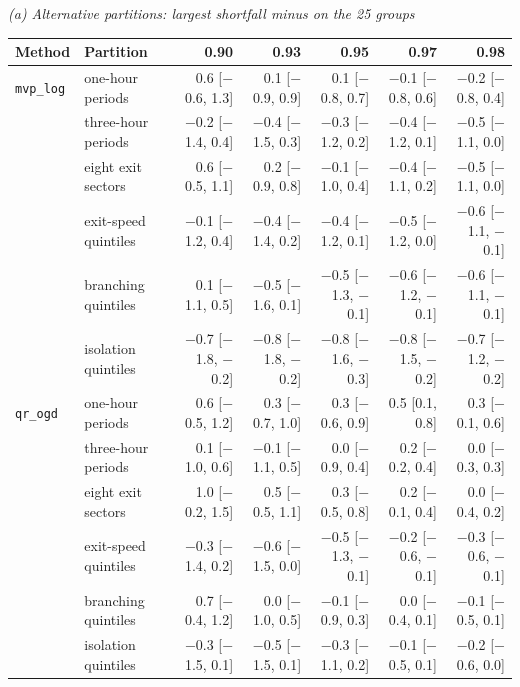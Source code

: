 \setlength{\tabcolsep}{3.0pt}
\emph{(a) Alternative partitions: largest shortfall minus \Dbar{} on the 25 groups}\par\smallskip
\begin{tabular}{@{}llrrrrr@{}}
\toprule
Method & Partition & 0.90 & 0.93 & 0.95 & 0.97 & 0.98 \\
\midrule
\texttt{mvp\_log} & one-hour periods & 0.6 [$-$0.6, 1.3] & 0.1 [$-$0.9, 0.9] & 0.1 [$-$0.8, 0.7] & $-$0.1 [$-$0.8, 0.6] & $-$0.2 [$-$0.8, 0.4] \\
 & three-hour periods & $-$0.2 [$-$1.4, 0.4] & $-$0.4 [$-$1.5, 0.3] & $-$0.3 [$-$1.2, 0.2] & $-$0.4 [$-$1.2, 0.1] & $-$0.5 [$-$1.1, 0.0] \\
 & eight exit sectors & 0.6 [$-$0.5, 1.1] & 0.2 [$-$0.9, 0.8] & $-$0.1 [$-$1.0, 0.4] & $-$0.4 [$-$1.1, 0.2] & $-$0.5 [$-$1.1, 0.0] \\
 & exit-speed quintiles & $-$0.1 [$-$1.2, 0.4] & $-$0.4 [$-$1.4, 0.2] & $-$0.4 [$-$1.2, 0.1] & $-$0.5 [$-$1.2, 0.0] & $-$0.6 [$-$1.1, $-$0.1] \\
 & branching quintiles & 0.1 [$-$1.1, 0.5] & $-$0.5 [$-$1.6, 0.1] & $-$0.5 [$-$1.3, $-$0.1] & $-$0.6 [$-$1.2, $-$0.1] & $-$0.6 [$-$1.1, $-$0.1] \\
 & isolation quintiles & $-$0.7 [$-$1.8, $-$0.2] & $-$0.8 [$-$1.8, $-$0.2] & $-$0.8 [$-$1.6, $-$0.3] & $-$0.8 [$-$1.5, $-$0.2] & $-$0.7 [$-$1.2, $-$0.2] \\
\addlinespace[2pt]
\texttt{qr\_ogd} & one-hour periods & 0.6 [$-$0.5, 1.2] & 0.3 [$-$0.7, 1.0] & 0.3 [$-$0.6, 0.9] & 0.5 [0.1, 0.8] & 0.3 [$-$0.1, 0.6] \\
 & three-hour periods & 0.1 [$-$1.0, 0.6] & $-$0.1 [$-$1.1, 0.5] & 0.0 [$-$0.9, 0.4] & 0.2 [$-$0.2, 0.4] & 0.0 [$-$0.3, 0.3] \\
 & eight exit sectors & 1.0 [$-$0.2, 1.5] & 0.5 [$-$0.5, 1.1] & 0.3 [$-$0.5, 0.8] & 0.2 [$-$0.1, 0.4] & 0.0 [$-$0.4, 0.2] \\
 & exit-speed quintiles & $-$0.3 [$-$1.4, 0.2] & $-$0.6 [$-$1.5, 0.0] & $-$0.5 [$-$1.3, $-$0.1] & $-$0.2 [$-$0.6, $-$0.1] & $-$0.3 [$-$0.6, $-$0.1] \\
 & branching quintiles & 0.7 [$-$0.4, 1.2] & 0.0 [$-$1.0, 0.5] & $-$0.1 [$-$0.9, 0.3] & 0.0 [$-$0.4, 0.1] & $-$0.1 [$-$0.5, 0.1] \\
 & isolation quintiles & $-$0.3 [$-$1.5, 0.1] & $-$0.5 [$-$1.5, 0.1] & $-$0.3 [$-$1.1, 0.2] & $-$0.1 [$-$0.5, 0.1] & $-$0.2 [$-$0.6, 0.0] \\
\bottomrule
\end{tabular}
